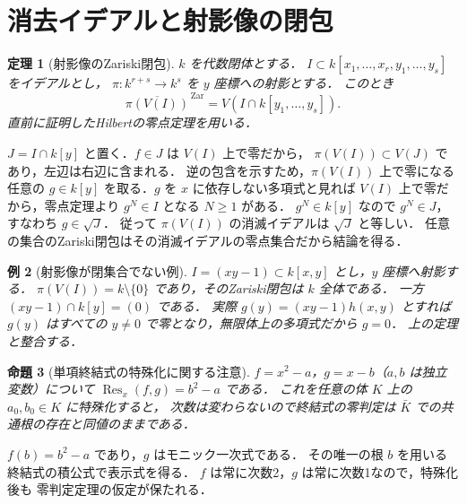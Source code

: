 \documentclass[a5paper,10pt,onecolumn]{jsarticle}
\makeatletter
\theoremstyle{mathnotetheorem}
\newtheorem{theorem}{定理}[section]
\newtheorem{proposition}[theorem]{命題}
\newtheorem{example}[theorem]{例}
\renewcommand{\proofname}{証明}
\renewenvironment{proof}[1][\proofname]{%
  \par\pushQED{\qed}\normalfont\topsep4\p@\@plus2\p@\relax
  \trivlist\item[\hskip\labelsep\bfseries #1]\ignorespaces
}{\popQED\endtrivlist\@endpefalse}
\makeatother
\begin{document}
\section{消去イデアルと射影像の閉包}
\begin{theorem}[射影像のZariski閉包]
$k$ を代数閉体とする．
$I\subset k[x_1,\ldots,x_r,y_1,\ldots,y_s]$ をイデアルとし，
$\pi:k^{r+s}\to k^s$ を $y$ 座標への射影とする．
このとき
\[
 \overline{\pi(V(I))}^{\,\mathrm{Zar}}
 =V(I\cap k[y_1,\ldots,y_s]).
\]
直前に証明したHilbertの零点定理を用いる．
\end{theorem}
\begin{proof}
$J=I\cap k[y]$ と置く．$f\in J$ は $V(I)$ 上で零だから，
$\pi(V(I))\subset V(J)$ であり，左辺は右辺に含まれる．
逆の包含を示すため，$\pi(V(I))$ 上で零になる任意の
$g\in k[y]$ を取る．$g$ を $x$ に依存しない多項式と見れば
$V(I)$ 上で零だから，零点定理より $g^N\in I$ となる $N\ge1$ がある．
$g^N\in k[y]$ なので $g^N\in J$，すなわち $g\in\sqrt J$．
従って $\pi(V(I))$ の消滅イデアルは $\sqrt J$ と等しい．
任意の集合のZariski閉包はその消滅イデアルの零点集合だから結論を得る．
\end{proof}
\begin{example}[射影像が閉集合でない例]
$I=(xy-1)\subset k[x,y]$ とし，$y$ 座標へ射影する．
$\pi(V(I))=k\setminus\{0\}$ であり，そのZariski閉包は $k$ 全体である．
一方 $(xy-1)\cap k[y]=(0)$ である．
実際 $g(y)=(xy-1)h(x,y)$ とすれば $g(y)$ はすべての
$y\ne0$ で零となり，無限体上の多項式だから $g=0$．
上の定理と整合する．
\end{example}
\begin{proposition}[単項終結式の特殊化に関する注意]
$f=x^2-a$，$g=x-b$（$a,b$ は独立変数）について
$\operatorname{Res}_x(f,g)=b^2-a$ である．
これを任意の体 $K$ 上の $a_0,b_0\in K$ に特殊化すると，
次数は変わらないので終結式の零判定は
$\bar K$ での共通根の存在と同値のままである．
\end{proposition}
\begin{proof}
$f(b)=b^2-a$ であり，$g$ はモニック一次式である．
その唯一の根 $b$ を用いる終結式の積公式で表示式を得る．
$f$ は常に次数2，$g$ は常に次数1なので，特殊化後も
零判定定理の仮定が保たれる．
\end{proof}
\end{document}
